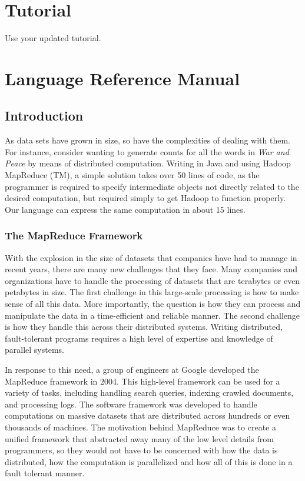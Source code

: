 \documentclass{report}
\begin{document}
\chapter{Tutorial}
\label{chap:tutor}

Use your updated tutorial.

\chapter{Language Reference Manual}
\label{chap:LRM}

\section{Introduction}
\label{sec:introduction}

As data sets have grown in size, so have the complexities of dealing with them.
For instance, consider wanting to generate counts for all the words in \emph{War
and Peace} by means of distributed computation. Writing in Java and using Hadoop
MapReduce (TM), a simple solution takes over 50 lines of code, as the programmer
is required to specify intermediate objects not directly related to the desired
computation, but required simply to get Hadoop to function properly. Our language 
can express the same computation in about 15 lines.

\subsection{The MapReduce Framework}
\label{sub:mapreduce}

With the explosion in the size of datasets that companies have had to manage in
recent years, there are many new challenges that they face. Many companies and
organizations have to handle the processing of datasets that are terabytes or even
petabytes in size. The first challenge in this large-scale processing is how to
make sense of all this data. More importantly, the question is how they can 
process and manipulate the data in a time-efficient and reliable manner. 
The second challenge is how they handle this across their distributed systems. Writing distributed, fault-tolerant programs requires a high level of expertise and knowledge of parallel systems.

In response to this need, a group of engineers at Google developed the MapReduce
framework in 2004. This high-level framework can be used for a variety of
tasks, including handling search queries, indexing crawled documents, and
processing logs. The software framework was developed to handle computations on
massive datasets that are distributed across hundreds or even thousands of
machines. The motivation behind MapReduce was to create a unified framework that
abstracted away many of the low level details from programmers, so they would not
have to be concerned with how the data is distributed, how the computation is
parallelized and how all of this is done in a fault tolerant manner.
\end{document}
